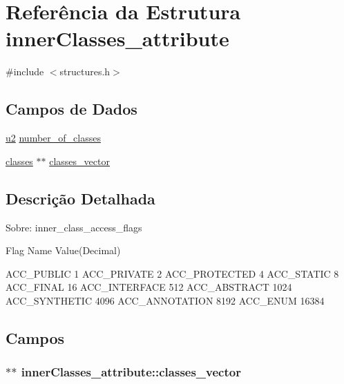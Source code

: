 \hypertarget{structinnerClasses__attribute}{}\section{Referência da Estrutura inner\+Classes\+\_\+attribute}
\label{structinnerClasses__attribute}


{\ttfamily \#include $<$structures.\+h$>$}

\subsection*{Campos de Dados}
\begin{DoxyCompactItemize}
\item 
\hyperlink{lista__operandos_8h_a732cde1300aafb73b0ea6c2558a7a54f}{u2} \hyperlink{structinnerClasses__attribute_a5025605be4999db69f5cf0309fa1e443}{number\+\_\+of\+\_\+classes}
\item 
\hyperlink{structclasses}{classes} $\ast$$\ast$ \hyperlink{structinnerClasses__attribute_a0179ecaaf1ae3febfc8553dcfb278679}{classes\+\_\+vector}
\end{DoxyCompactItemize}


\subsection{Descrição Detalhada}
Sobre\+: inner\+\_\+class\+\_\+access\+\_\+flags

Flag Name Value(\+Decimal)

A\+C\+C\+\_\+\+P\+U\+B\+L\+IC 1 A\+C\+C\+\_\+\+P\+R\+I\+V\+A\+TE 2 A\+C\+C\+\_\+\+P\+R\+O\+T\+E\+C\+T\+ED 4 A\+C\+C\+\_\+\+S\+T\+A\+T\+IC 8 A\+C\+C\+\_\+\+F\+I\+N\+AL 16 A\+C\+C\+\_\+\+I\+N\+T\+E\+R\+F\+A\+CE 512 A\+C\+C\+\_\+\+A\+B\+S\+T\+R\+A\+CT 1024 A\+C\+C\+\_\+\+S\+Y\+N\+T\+H\+E\+T\+IC 4096 A\+C\+C\+\_\+\+A\+N\+N\+O\+T\+A\+T\+I\+ON 8192 A\+C\+C\+\_\+\+E\+N\+UM 16384 

\subsection{Campos}
\subsubsection[{\texorpdfstring{classes\+\_\+vector}{classes_vector}}]{$\ast$$\ast$ inner\+Classes\+\_\+attribute\+::classes\+\_\+vector}\hypertarget{structinnerClasses__attribute_a0179ecaaf1ae3febfc8553dcfb278679}{}\label{structinnerClasses__attribute_a0179ecaaf1ae3febfc8553dcfb278679}
